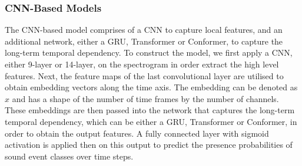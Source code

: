 \subsubsection{CNN-Based Models}
The CNN-based model comprises of a CNN to capture local features, and an additional network, either a GRU, Transformer or Conformer, to capture the long-term temporal dependency. To construct the model, we first apply a CNN, either 9-layer or 14-layer, on the spectrogram in order extract the high level features. Next, the feature maps of the last convolutional layer are utilised to obtain embedding vectors along the time axis. The embedding can be denoted as \(x\) and has a shape of the number of time frames by the number of channels. These embeddings are then passed into the network that captures the long-term temporal dependency, which can be either a GRU, Transformer or Conformer, in order to obtain the output features. A fully connected layer with sigmoid activation is applied then on this output to predict the presence probabilities of sound event classes over time steps.


